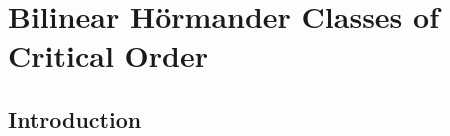 
\cleardoublepage


\chapter{Bilinear H\"ormander Classes of Critical Order}\label{chapter3}
\label{makereference3}

\section{Introduction}

